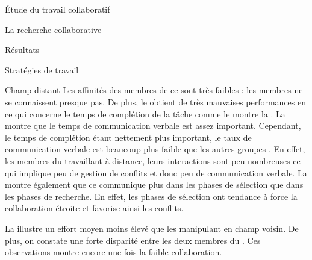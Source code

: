 \documentclass[myfrancais]{mythesis}
\begin{document}
\begin{mypart}{Étude du travail collaboratif}
\begin{mychapter}{La recherche collaborative}
\begin{mysection}{Résultats}
\begin{mysubsection}{Stratégies de travail}
\begin{mysubsubsection}{Champ distant}
						Les affinités des membres de ce  sont très faibles  : les membres ne se connaissent presque pas.
						De plus, le  obtient de très mauvaises performances en ce qui concerne le temps de complétion de la tâche comme le montre la .
						La  montre que le temps de communication verbale est assez important.
						Cependant, le temps de complétion étant nettement plus important, le taux de communication verbale est beaucoup plus faible que les autres groupes .
						En effet, les membres du  travaillant à distance, leurs interactions sont peu nombreuses ce qui implique peu de gestion de conflits et donc peu de communication verbale.
						La  montre également que ce  communique plus dans les phases de sélection que dans les phases de recherche.
						En effet, les phases de sélection ont tendance à force la collaboration étroite et favorise ainsi les conflits.

						La  illustre un effort moyen moins élevé que les  manipulant en champ voisin.
						De plus, on constate une forte disparité entre les deux membres du .
						Ces observations montre encore une fois la faible collaboration.


\end{mysubsubsection}
\end{mysubsection}
\end{mysection}
\end{mychapter}
\end{mypart}
\end{document}

